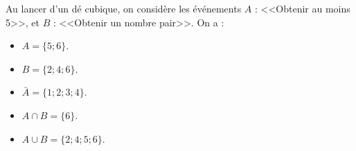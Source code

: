 \begin{myex}
	Au lancer d'un dé cubique, on considère les événements $A$ : <<Obtenir au moins 5>>, et $B$ : <<Obtenir un nombre pair>>. On a :
	\begin{multicols}{2}


	\begin{itemize}
		\item $A = \{5 ; 6\}$.
		\item $B = \{2 ; 4 ; 6\}$.
		\item $\bar{A} = \{1 ; 2 ; 3 ; 4\}$.
		\item $A \cap B = \{6\}$.
		\item $A \cup B = \{2 ; 4 ; 5 ; 6\}$.
	\end{itemize}
	
	\end{multicols}
\end{myex}		
